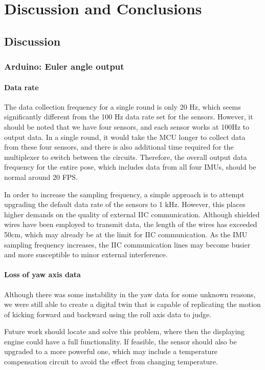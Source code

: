 \chapter{Discussion and Conclusions}


\section{Discussion}
\subsection{Arduino:  Euler angle output}
\subsubsection{Data rate}
The data collection frequency for a single round is only 20 Hz, which seems significantly different from the 100 Hz data rate set for the sensors.
However, it should be noted that we have four sensors, and each sensor works at 100Hz to output data.
In a single round, it would take the MCU longer to collect data from these four sensors, and there is also additional time required for the multiplexer to switch between the circuits.
Therefore, the overall output data frequency for the entire pose, which includes data from all four IMUs, should be normal around 20 FPS\@.

In order to increase the sampling frequency, a simple approach is to attempt upgrading the default data rate of the sensors to 1 kHz. However, this places higher demands on the quality of external IIC communication.
Although shielded wires have been employed to transmit data, the length of the wires has exceeded 50cm, which may already be at the limit for IIC communication.
As the IMU sampling frequency increases, the IIC communication lines may become busier and more susceptible to minor external interference.

\subsubsection{Loss of yaw axis data}

Although there was some instability in the yaw data for some unknown reasons, we were still able to create a digital twin that is capable of replicating the motion of kicking forward and backward using the roll axis data to judge.

Future work should locate and solve this problem, where then the displaying engine could have a full functionality.
If feasible, the sensor should also be upgraded to a more powerful one, which may include a temperature compensation circuit to avoid the effect from changing temperature.

